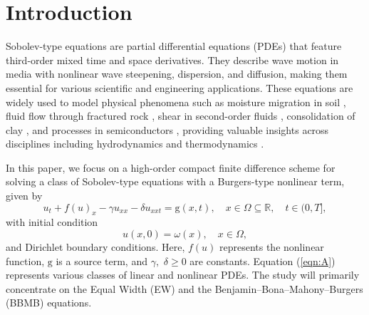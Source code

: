 \documentclass[11pt,a4paper]{amsart}
\theoremstyle{plain}
\theoremstyle{definition}
\theoremstyle{remark}
\numberwithin{equation}{section}
\begin{document}
\section{\bf Introduction} 
\label{sec:1}
Sobolev-type equations are partial differential equations (PDEs) that feature third-order mixed time and space derivatives. They describe wave motion in media with nonlinear wave steepening, dispersion, and diffusion, making them essential for various scientific and engineering applications. These equations are widely used to model physical phenomena such as moisture migration in soil \cite{shi1990initial}, fluid flow through fractured rock \cite{barenblatt1960basic}, shear in second-order fluids \cite{ting1974cooling}, consolidation of clay \cite{taylor1942research}, and processes in semiconductors \cite{gao2017weak}, providing valuable insights across disciplines including hydrodynamics \cite{gao2015modified}  and thermodynamics \cite{ewing1977coupled}.
\par
In this paper, we focus on a high-order compact finite difference scheme for solving a class of Sobolev-type equations with a Burgers-type nonlinear term, given by
\begin{equation} 
u_t +  f(u)_x -\gamma u_{xx}  - \delta u_{xxt} = \mathrm{g}(x,t), \quad x \in \Omega \subseteq \mathbb{R} , \quad t \in (0, T],
\label{eqn:A}
\end{equation}
with initial condition
\begin{equation} \label{eqn:A_IC}
u(x,0) = \omega (x), \quad x \in \Omega,
\end{equation}
and Dirichlet boundary conditions. Here, $f(u)$ represents the nonlinear function, $\mathrm{g}$ is a source term, and $\gamma,\,\, \delta \geq 0$ are constants. Equation (\ref{eqn:A}) represents various classes of linear and nonlinear PDEs. The study will primarily concentrate on the Equal Width (EW) and the Benjamin–Bona–Mahony–Burgers (BBMB) equations.
\end{document}
